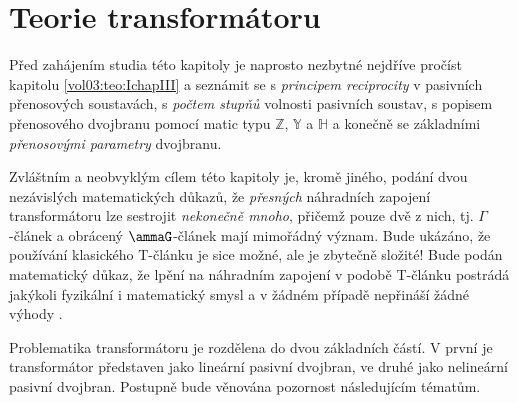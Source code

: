 \setchaptertoc
\chapter{Teorie transformátoru}\label{ES:kap_teorie_trafa}
  Před zahájením studia této kapitoly je naprosto nezbytné nejdříve pročíst kapitolu 
  \ref{vol03:teo:IchapIII} a seznámit se s \emph{principem reciprocity} v pasivních přenosových 
  soustavách, s \emph{počtem stupňů} volnosti pasivních soustav, s popisem přenosového dvojbranu 
  pomocí matic typu \(\mathbb{Z}\), \(\mathbb{Y}\) a \(\mathbb{H}\) a konečně se základními 
  \emph{přenosovými parametry} dvojbranu.
  
  Zvláštním a neobvyklým cílem této kapitoly je, kromě jiného, podání dvou nezávislých 
  matematických důkazů, že \emph{přesných} náhradních zapojení transformátoru lze sestrojit 
  \emph{nekonečně mnoho}, přičemž pouze dvě z nich, tj. \(\Gamma\)-článek a obrácený 
  \(\ammaG\)-článek mají mimořádný význam. Bude ukázáno, že používání klasického T-článku je sice 
  možné, ale je zbytečně složité! Bude podán matematický důkaz, že lpění na náhradním zapojení v 
  podobě T-článku postrádá jakýkoli fyzikální i matematický smysl a v žádném případě nepřináší 
  žádné výhody \cite[s.~340]{Patocka4}. 

  Problematika transformátoru je rozdělena do dvou základních částí. V první je transformátor  
  představen jako lineární pasivní dvojbran, ve druhé jako nelineární pasivní dvojbran. Postupně  
  bude věnována pozornost následujícím tématům.

